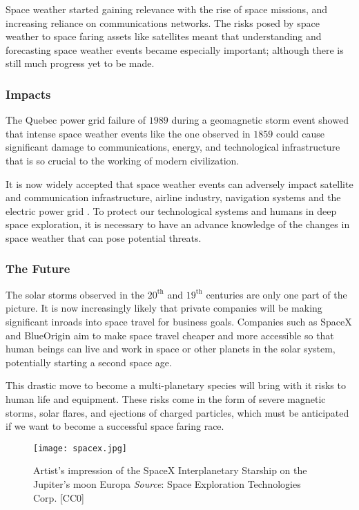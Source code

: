 Space weather started gaining relevance with the rise of space missions, and increasing reliance on 
communications networks. The risks posed by space weather to space faring assets like satellites 
meant that understanding and forecasting space weather events became especially important; although 
there is still much progress yet to be made. 

\subsubsection*{Impacts}

The Quebec power grid failure of $1989$ \citep{kappenman1997geomagnetic} during a geomagnetic storm 
event showed that intense space weather events like the one observed in $1859$ could cause 
significant damage to communications, energy, and technological infrastructure that is so crucial 
to the working of modern civilization.

It is now widely accepted that space weather events can adversely impact satellite and 
communication infrastructure, airline industry, navigation systems and the electric power grid 
\citep{board2009severe,cannon2013extreme,bothmer2007space,baker2004effects}. To protect our 
technological systems and humans in deep space exploration, it is necessary to have an advance 
knowledge of the changes in space weather that can pose potential threats.

\subsubsection*{The Future}

The solar storms observed in the $20^{\text{th}}$ and $19^{\text{th}}$ centuries are only one 
part of the picture. It is now increasingly likely that private companies will be making 
significant inroads into space travel for business goals. Companies such as SpaceX and BlueOrigin 
aim to make space travel cheaper and more accessible so that human beings can live and work in 
space or other planets in the solar system, potentially starting a second space age.

This drastic move to become a multi-planetary species will bring with it risks to human life and 
equipment. These risks come in the form of severe magnetic storms, solar flares, and ejections of 
charged particles, which must be anticipated if we want to become a successful space faring race. 

\begin{figure}
    \centering\texttt{[image: spacex.jpg]}
    \caption{
        {\small
            Artist's impression of the SpaceX Interplanetary Starship on the Jupiter's moon Europa 
            \textit{Source}: Space Exploration Technologies Corp. [CC0]
        } 
    }
    \label{fig:spacex}
\end{figure}

